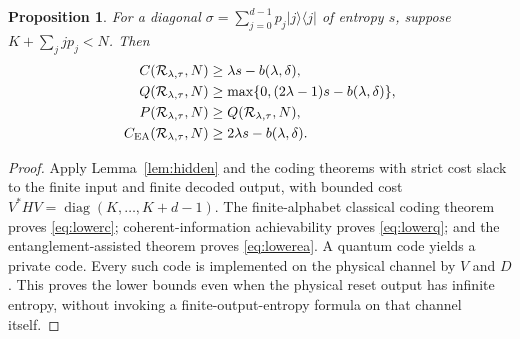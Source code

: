 \documentclass[11pt]{article}
\newtheorem{proposition}[theorem]{Proposition}
\newcommand{\Rcal}{\mathcal R_{\lambda,\tau}}
\begin{document}
\begin{proposition}\label{prop:lower}
For a diagonal $\sigma=\sum_{j=0}^{d-1}p_j|j\rangle\langle j|$ of
entropy $s$, suppose $K+\sum_jjp_j<N$. Then
\begin{align}
 C(\Rcal,N)&\ge\lambda s-b(\lambda,\delta),\label{eq:lowerc}\\
 Q(\Rcal,N)&\ge\max\{0,(2\lambda-1)s-b(\lambda,\delta)\},\label{eq:lowerq}\\
 P(\Rcal,N)&\ge Q(\Rcal,N),\label{eq:lowerp}\\
 C_{\rm EA}(\Rcal,N)&\ge2\lambda s-b(\lambda,\delta).\label{eq:lowerea}
\end{align}
\end{proposition}
\begin{proof}
Apply Lemma~\ref{lem:hidden} and the coding theorems with strict cost
slack to the finite input and finite decoded output, with bounded cost
$V^*HV=\operatorname{diag}(K,\ldots,K+d-1)$.
The finite-alphabet classical coding theorem proves \eqref{eq:lowerc};
coherent-information achievability \cite[Theorem 2]{wq} proves
\eqref{eq:lowerq}; and the entanglement-assisted theorem
\cite[Theorem 1]{hs} proves \eqref{eq:lowerea}.
A quantum code yields a private code.
Every such code is implemented on the physical channel by $V$ and $D$.
This proves the lower bounds even when the physical reset output has
infinite entropy, without invoking a finite-output-entropy formula on
that channel itself.
\end{proof}
\end{document}
